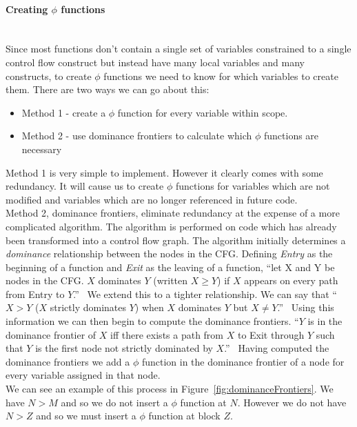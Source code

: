 \documentclass[12pt, titlepage]{article}
\begin{document}
\paragraph*{Creating $\phi$ functions}\mbox{} \\
Since most functions don't contain a single set of variables constrained to a single control flow construct but instead have many local variables and many constructs, to create $\phi$ functions we need to know for which variables to create them. There are two ways we can go about this:
\begin{itemize}
	\item Method 1 - create a $\phi$ function for every variable within scope.
	\item Method 2 - use dominance frontiers to calculate which $\phi$ functions are necessary
\end{itemize}
Method 1 is very simple to implement. However it clearly comes with some redundancy. It will cause us to create $\phi$ functions for variables which are not modified and variables which are no longer referenced in future code. \\
\indent Method 2, dominance frontiers, eliminate redundancy at the expense of a more complicated algorithm. The algorithm is performed on code which has already been transformed into a control flow graph. The algorithm initially determines a \textit{dominance} relationship between the nodes in the CFG. Defining \textit{Entry} as the beginning of a function and \textit{Exit} as the leaving of a function, ``let X and Y be nodes in the CFG. $X$ dominates $Y$ (written $X≥Y$) if $X$ appears on every path from Entry to $Y$.''~\cite{ssaLecture} We extend this to a tighter relationship. We can say that ``$X>Y$ ($X$ strictly dominates $Y$) when $X$ dominates $Y$ but $X \neq Y$.''~\cite{ssaLecture} Using this information we can then begin to compute the dominance frontiers. ``$Y$ is in the dominance frontier of $X$ iff there exists a path from $X$ to Exit through $Y$ such that $Y$ is the first node not strictly dominated by $X$.''~\cite{ssaLecture} Having computed the dominance frontiers we add a $\phi$ function in the dominance frontier of a node for every variable assigned in that node. \\
\indent We can see an example of this process in Figure~\ref{fig:dominanceFrontiers}. We have $N>M$ and so we do not insert a $\phi$ function at $N$. However we do not have $N>Z$ and so we must insert a $\phi$ function at block $Z$. \\
\end{document}
